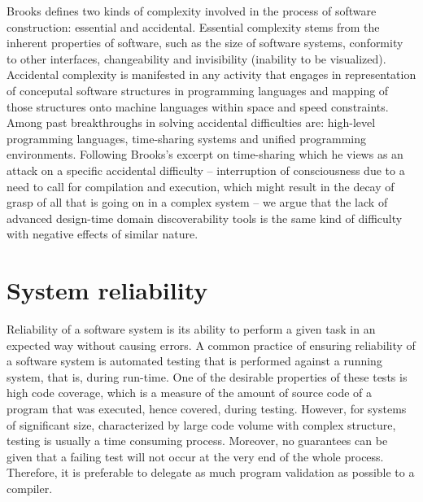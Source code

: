 Brooks \cite{brooks} defines two kinds of complexity involved in the process of software construction: essential and accidental.
Essential complexity stems from the inherent properties of software, such as the size of software systems, conformity to other interfaces, changeability and invisibility (inability to be visualized).
Accidental complexity is manifested in any activity that engages in representation of conceputal software structures in programming languages and mapping of those structures onto machine languages within space and speed constraints.
Among past breakthroughs in solving accidental difficulties are: high-level programming languages, time-sharing systems and unified programming environments.
Following Brooks’s excerpt on time-sharing which he views as an attack on a specific accidental difficulty -- interruption of consciousness due to a need to call for compilation and execution, which might result in the decay of grasp of all that is going on in a complex system -- we argue that the lack of advanced design-time domain discoverability tools is the same kind of difficulty with negative effects of similar nature.

\section{System reliability}
Reliability of a software system is its ability to perform a given task in an expected way without causing errors.
A common practice of ensuring reliability of a software system is automated testing that is performed against a running system, that is, during run-time.
One of the desirable properties of these tests is high code coverage, which is a measure of the amount of source code of a program that was executed, hence covered, during testing.
However, for systems of significant size, characterized by large code volume with complex structure, testing is usually a time consuming process.
Moreover, no guarantees can be given that a failing test will not occur at the very end of the whole process.
Therefore, it is preferable to delegate as much program validation as possible to a compiler.

